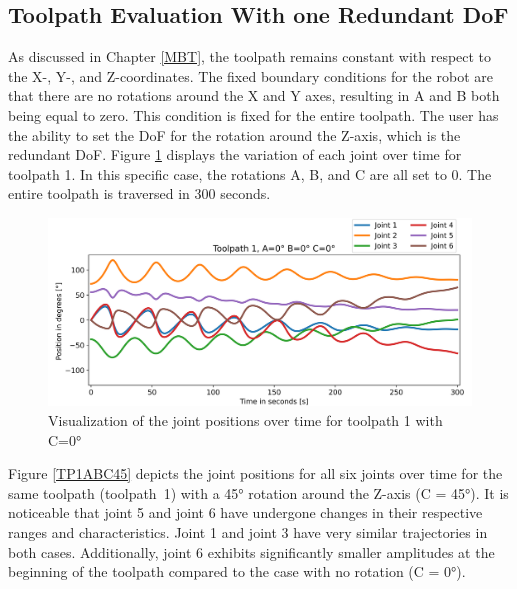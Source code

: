 \subsection{Toolpath Evaluation With one Redundant DoF}
As discussed in Chapter \ref{MBT}, the toolpath remains constant with respect to the X-, Y-, and Z-coordinates. The fixed boundary conditions for the robot are that there are no rotations around the X and Y axes, resulting in A and B both being equal to zero. This condition is fixed for the entire toolpath. The user has the ability to set the \acrshort{DoF} for the rotation around the Z-axis, which is the redundant \acrshort{DoF}. Figure \ref{TP1ABC0} displays the variation of each joint over time for toolpath 1. In this specific case, the rotations A, B, and C are all set to 0. The entire toolpath is traversed in 300 seconds.
\begin{figure}[H]
	\centerline{\includegraphics[width=1\textwidth]{figures/TP1ABC0.png}}
	\caption{Visualization of the joint positions over time for toolpath 1 with C=0°}
	\label{TP1ABC0}
\end{figure}

Figure \ref{TP1ABC45} depicts the joint positions for all six joints over time for the same toolpath (toolpath~1) with a 45° rotation around the Z-axis (C = 45°).  It is noticeable that joint 5 and joint 6 have undergone changes in their respective ranges and characteristics. Joint 1 and joint 3 have very similar trajectories in both cases. Additionally, joint 6 exhibits significantly smaller amplitudes at the beginning of the toolpath compared to the case with no rotation (C = 0°).

